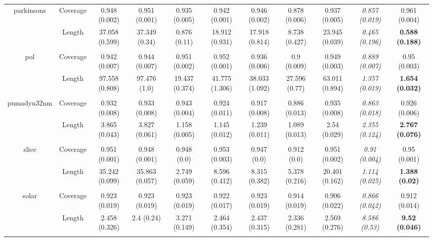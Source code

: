 \begin{tabular}{ccccccccccc}
\hline \\
\hline
parkinsons & Coverage & 0.948 (0.002)  &  0.951 (0.001)  &  0.935 (0.005)  &  0.942 (0.001)  &  0.946 (0.002)  &  0.878 (0.006)  &  0.937 (0.005)  & \textit{ 0.857 (0.019) } &  0.961 (0.004) \\ 
& Length & 37.058 (0.599)  &  37.349 (0.34)  &  0.876 (0.11)  &  18.912 (0.931)  &  17.918 (0.814)  &  8.738 (0.427)  &  23.945 (0.039)  & \textit{ 0.465 (0.196) } &  \textbf{0.588 (0.188)} \\ 
\hline \\
\hline
pol & Coverage & 0.942 (0.007)  &  0.944 (0.007)  &  0.951 (0.002)  &  0.952 (0.001)  &  0.936 (0.006)  &  0.9 (0.009)  &  0.949 (0.003)  & \textit{ 0.889 (0.007) } &  0.95 (0.003) \\ 
& Length & 97.558 (0.808)  &  97.476 (1.0)  &  19.437 (0.374)  &  41.775 (1.306)  &  38.033 (1.092)  &  27.596 (0.77)  &  63.011 (0.894)  & \textit{ 1.357 (0.019) } &  \textbf{1.654 (0.032)} \\ 
\hline \\
\hline
pumadyn32nm & Coverage & 0.932 (0.008)  &  0.933 (0.008)  &  0.943 (0.004)  &  0.924 (0.011)  &  0.917 (0.008)  &  0.886 (0.013)  &  0.935 (0.008)  & \textit{ 0.863 (0.018) } &  0.926 (0.006) \\ 
& Length & 3.865 (0.043)  &  3.827 (0.061)  &  1.158 (0.005)  &  1.145 (0.012)  &  1.239 (0.011)  &  1.089 (0.013)  &  2.54 (0.029)  & \textit{ 2.355 (0.124) } &  \textbf{2.767 (0.076)} \\ 
\hline \\
\hline
slice & Coverage & 0.951 (0.001)  &  0.948 (0.001)  &  0.948 (0.0)  &  0.953 (0.003)  &  0.947 (0.0)  &  0.912 (0.0)  &  0.951 (0.002)  & \textit{ 0.91 (0.004) } &  0.95 (0.001) \\ 
& Length & 35.242 (0.099)  &  35.863 (0.057)  &  2.749 (0.059)  &  8.596 (0.412)  &  8.315 (0.382)  &  5.378 (0.216)  &  20.401 (0.162)  & \textit{ 1.114 (0.025) } &  \textbf{1.388 (0.02)} \\ 
\hline \\
\hline
solar & Coverage & 0.923 (0.019)  &  0.923 (0.019)  &  0.923 (0.019)  &  0.922 (0.017)  &  0.923 (0.019)  &  0.914 (0.019)  &  0.906 (0.022)  & \textit{ 0.866 (0.042) } &  0.912 (0.014) \\ 
& Length & 2.458 (0.326)  &  2.4 (0.24)  &  3.271 (0.149)  &  2.464 (0.354)  &  2.437 (0.315)  &  2.336 (0.281)  &  2.569 (0.276)  & \textit{ 8.586 (0.53) } &  \textbf{9.52 (0.046)} \\ 
\hline \\
\hline
\bottomrule
\end{tabular}